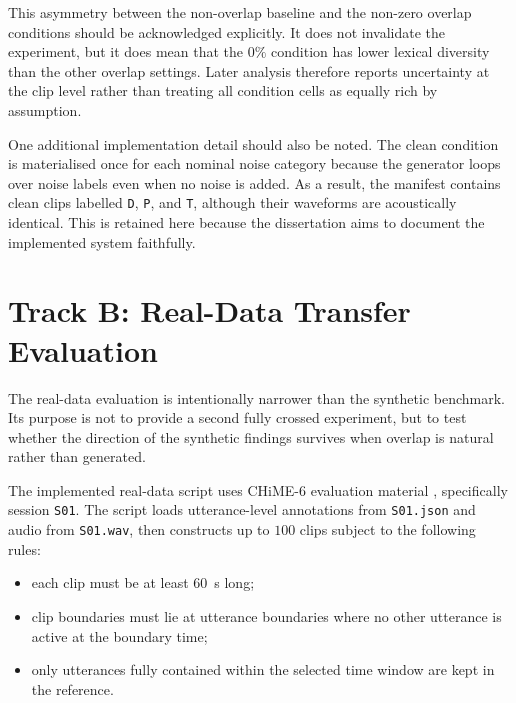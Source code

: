 
This asymmetry between the non-overlap baseline and the non-zero overlap conditions should be acknowledged explicitly. It does not invalidate the experiment, but it does mean that the \(0\%\) condition has lower lexical diversity than the other overlap settings. Later analysis therefore reports uncertainty at the clip level rather than treating all condition cells as equally rich by assumption.

One additional implementation detail should also be noted. The clean condition is materialised once for each nominal noise category because the generator loops over noise labels even when no noise is added. As a result, the manifest contains clean clips labelled \texttt{D}, \texttt{P}, and \texttt{T}, although their waveforms are acoustically identical. This is retained here because the dissertation aims to document the implemented system faithfully.

\section{Track B: Real-Data Transfer Evaluation}
\label{sec:real_transfer}
The real-data evaluation is intentionally narrower than the synthetic benchmark. Its purpose is not to provide a second fully crossed experiment, but to test whether the direction of the synthetic findings survives when overlap is natural rather than generated.

The implemented real-data script uses CHiME-6 evaluation material \citep{chime6, watanabe2020chime6challengetacklingmultispeakerspeech}, specifically session \texttt{S01}. The script loads utterance-level annotations from \texttt{S01.json} and audio from \texttt{S01.wav}, then constructs up to \(100\) clips subject to the following rules:
\begin{itemize}
    \item each clip must be at least \SI{60}{\second} long;
    \item clip boundaries must lie at utterance boundaries where no other utterance is active at the boundary time;
    \item only utterances fully contained within the selected time window are kept in the reference.
\end{itemize}

